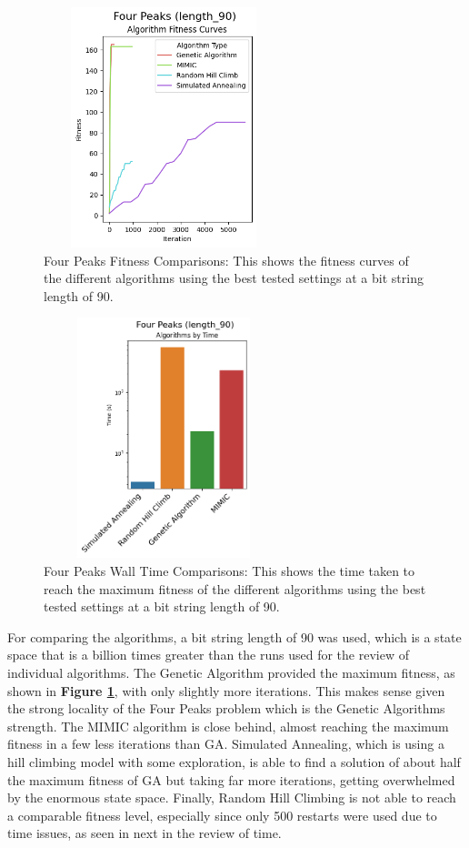 \documentclass[letterpaper]{article} %
\begin{document}
\begin{figure}[!htb]
\centering
\includegraphics[width=2.75in, height=2.75in]{figures/Four_Peaks_length_90_Algorithm_Fitness_Curves_.png}
\caption{Four Peaks Fitness Comparisons: This shows the fitness curves of the different algorithms using the best tested settings at a bit string length of 90.  }
\label{fig:four_peaks_fitness_comparison_90}
\end{figure}

\begin{figure}[!htb]
\centering
\includegraphics[width=2.75in, height=2.75in]{figures/Four_Peaks_length_90_Algorithms_by_Time_.png}
\caption{Four Peaks Wall Time Comparisons: This shows the time taken to reach the maximum fitness of the different algorithms using the best tested settings at a bit string length of 90.  }
\label{fig:four_peaks_walltime_comparison_90}
\end{figure}

For comparing the algorithms, a bit string length of 90 was used, which is a state space that is a billion times greater than the runs used for the review of individual algorithms.  The Genetic Algorithm provided the maximum fitness, as shown in \textbf{Figure \ref{fig:four_peaks_fitness_comparison_90}}, with only slightly more iterations.  This makes sense given the strong locality of the Four Peaks problem which is the Genetic Algorithms strength.  The MIMIC algorithm is close behind, almost reaching the maximum fitness in a few less iterations than GA.  Simulated Annealing, which is using a hill climbing model with some exploration, is able to find a solution of about half the maximum fitness of GA but taking far more iterations, getting overwhelmed by the enormous state space.  Finally, Random Hill Climbing is not able to reach a comparable fitness level, especially since only 500 restarts were used due to time issues, as seen in next in the review of time.
\end{document}
